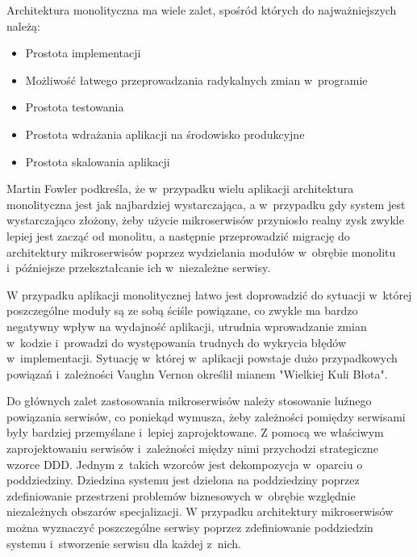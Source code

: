 \par
Architektura monolityczna ma wiele zalet\cite{book:microservices-patterns}, spośród których do najważniejszych należą:
\begin{itemize}
    \item Prostota implementacji
    \item Możliwość łatwego przeprowadzania radykalnych zmian w~programie
    \item Prostota testowania
    \item Prostota wdrażania aplikacji na środowisko produkcyjne
    \item Prostota skalowania aplikacji
\end{itemize}

\par
Martin Fowler podkreśla, że w~przypadku wielu aplikacji architektura monolityczna jest jak najbardziej wystarczająca,
a w~przypadku gdy system jest wystarczająco złożony, żeby użycie mikroserwisów przyniosło realny zysk zwykle lepiej jest zacząć od monolitu,
a następnie przeprowadzić migrację do architektury mikroserwisów poprzez wydzielania modułów w~obrębie monolitu i~późniejsze przekształcanie ich w~niezależne serwisy\cite{url:monolith-first}.

\par
W przypadku aplikacji monolitycznej łatwo jest doprowadzić do sytuacji w~której poszczególne moduły są ze sobą ściśle powiązane, co zwykle ma bardzo negatywny wpływ na wydajność aplikacji, utrudnia wprowadzanie zmian w~kodzie i~prowadzi do występowania trudnych do wykrycia błędów w~implementacji.
Sytuację w~której w~aplikacji powstaje dużo przypadkowych powiązań i~zależności Vaughn Vernon określił mianem "Wielkiej Kuli Błota"\cite{book:ddd-kompendium}.

\par
Do głównych zalet zastosowania mikroserwisów należy stosowanie luźnego powiązania serwisów, co poniekąd wymusza, żeby zależności pomiędzy serwisami były bardziej przemyślane i~lepiej zaprojektowane.
Z pomocą we właściwym zaprojektowaniu serwisów i~zależności między nimi przychodzi strategiczne wzorce DDD.
Jednym z~takich wzorców jest dekompozycja w~oparciu o poddziedziny\cite{book:ddd-evans}.
Dziedzina systemu jest dzielona na poddziedziny poprzez zdefiniowanie przestrzeni problemów biznesowych w~obrębie względnie niezależnych obszarów specjalizacji.
W przypadku architektury mikroserwisów można wyznaczyć poszczególne serwisy poprzez zdefiniowanie poddziedzin systemu i~stworzenie serwisu dla każdej z~nich\cite{book:microservices-patterns}.

